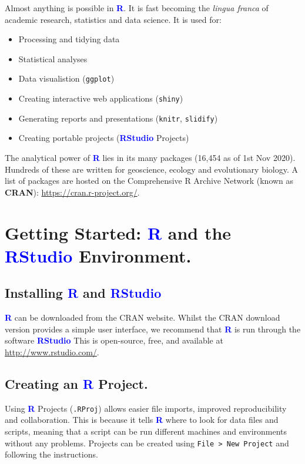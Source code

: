 \documentclass[a4paper,12pt]{article}
\newcommand\boldblue[1]{\textcolor{blue}{\textbf{#1}}}
\begin{document}
Almost anything is possible in \boldblue{R}. It is fast becoming the \textit{lingua franca} of academic research, statistics and data science. It is used for:

\begin{itemize}
\item Processing and tidying data 
\item Statistical analyses
\item Data visualistion (\texttt{ggplot})
\item Creating interactive web applications (\texttt{shiny})
\item Generating reports and presentations (\texttt{knitr}, \texttt{slidify})
\item Creating portable projects (\boldblue{RStudio} Projects)
\end{itemize}

The analytical power of \boldblue{R} lies in its many packages (16,454 as of 1st Nov 2020). Hundreds of these are written for geoscience, ecology and evolutionary biology. A list of packages are hosted on the Comprehensive R Archive Network (known as \textbf{CRAN}): \url{https://cran.r-project.org/}.

\section {Getting Started: \boldblue{R} and the \boldblue{RStudio} Environment.}
\subsection {Installing \boldblue{R} and \boldblue{RStudio}}

\boldblue{R} can be downloaded from the CRAN website. Whilst the CRAN download version provides a simple user interface, we recommend that \boldblue{R} is run through the software \boldblue{RStudio} This is open-source, free, and available at \url{http://www.rstudio.com/}.

\subsection {Creating an \boldblue{R} Project.}

Using \boldblue{R} Projects (\texttt{.RProj}) allows easier file imports, improved reproducibility and collaboration. This is because it tells \boldblue{R} where to look for data files and scripts, meaning that a script can be run different machines and environments without any problems. Projects can be created using \texttt{File > New Project} and following the instructions. \\ 
\end{document}
